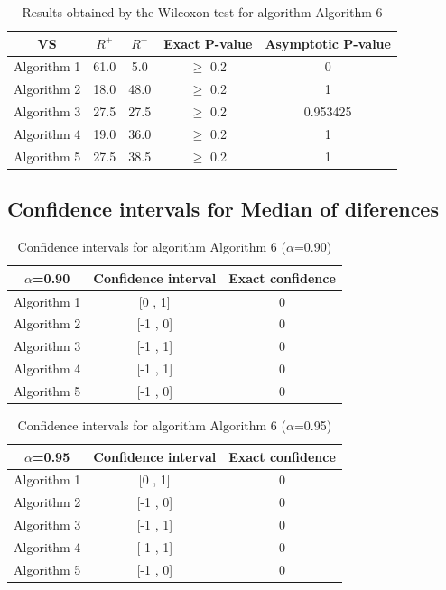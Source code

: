 \documentclass[a4paper,10pt]{article}
\begin{document}
\begin{table}[!htp]
\centering\small
\begin{tabular}{
|c|c|c|c|c|}
\hline
 VS & $R^{+}$ & $R^{-}$ & Exact P-value & Asymptotic P-value \\ \hline 
Algorithm 1 & 61.0 & 5.0 & $\geq$ 0.2 & 0\\ \hline 
Algorithm 2 & 18.0 & 48.0 & $\geq$ 0.2 & 1\\ \hline 
Algorithm 3 & 27.5 & 27.5 & $\geq$ 0.2 & 0.953425\\ \hline 
Algorithm 4 & 19.0 & 36.0 & $\geq$ 0.2 & 1\\ \hline 
Algorithm 5 & 27.5 & 38.5 & $\geq$ 0.2 & 1\\ \hline 

\end{tabular}
\caption{Results obtained by the Wilcoxon test for algorithm Algorithm 6}
\end{table}

\subsection{Confidence intervals for Median of diferences}

\begin{table}[!htp]
\centering\small
\begin{tabular}{
|c|c|c|}
\hline
 $\alpha$=0.90 & Confidence interval & Exact confidence \\ \hline 
Algorithm 1 & [0 , 1] & 0\\ \hline 
Algorithm 2 & [-1 , 0] & 0\\ \hline 
Algorithm 3 & [-1 , 1] & 0\\ \hline 
Algorithm 4 & [-1 , 1] & 0\\ \hline 
Algorithm 5 & [-1 , 0] & 0\\ \hline 

\end{tabular}
\caption{Confidence intervals for algorithm Algorithm 6 ($\alpha$=0.90)}
\end{table}
\begin{table}[!htp]
\centering\small
\begin{tabular}{
|c|c|c|}
\hline
 $\alpha$=0.95 & Confidence interval & Exact confidence \\ \hline 
Algorithm 1 & [0 , 1] & 0\\ \hline 
Algorithm 2 & [-1 , 0] & 0\\ \hline 
Algorithm 3 & [-1 , 1] & 0\\ \hline 
Algorithm 4 & [-1 , 1] & 0\\ \hline 
Algorithm 5 & [-1 , 0] & 0\\ \hline 

\end{tabular}
\caption{Confidence intervals for algorithm Algorithm 6 ($\alpha$=0.95)}
\end{table}

 \clearpage 
\end{document}
